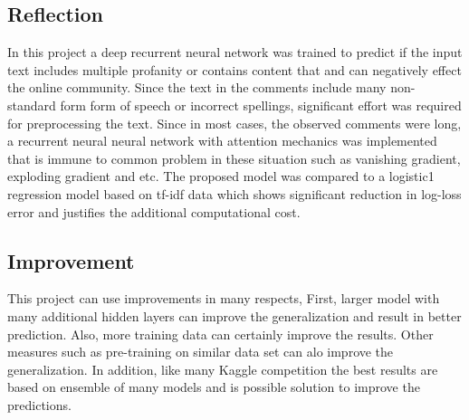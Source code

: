 \documentclass{article}
\begin{document}
    \subsection{Reflection}

    In this project a deep recurrent neural network was trained to predict if the input text includes multiple profanity or contains content that and can negatively effect the online community. Since the text in the comments include many non-standard form form of speech or incorrect spellings, significant effort was required for preprocessing the text. Since in most cases, the observed comments were long, a recurrent neural neural network with attention mechanics was implemented that is immune to common problem in these situation such as vanishing gradient, exploding gradient and etc. The proposed model was compared to a logistic1 regression model based on tf-idf data which shows significant reduction in log-loss error and justifies the additional computational cost.


    \subsection{Improvement}
    This project can use improvements in many respects, First, larger model with many additional hidden layers can improve the generalization and result in better prediction. Also, more training data can certainly improve the results. Other measures such as pre-training on similar data set can alo improve the generalization. In addition, like many Kaggle competition the best results are based on ensemble of many models and is possible solution to improve the predictions.




    
\end{document}

